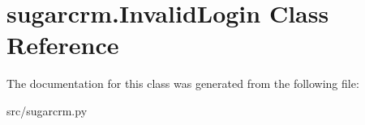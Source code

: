 \hypertarget{classsugarcrm_1_1_invalid_login}{
\section{sugarcrm.InvalidLogin Class Reference}
\label{classsugarcrm_1_1_invalid_login}
}


The documentation for this class was generated from the following file:\begin{DoxyCompactItemize}
\item 
src/sugarcrm.py\end{DoxyCompactItemize}
